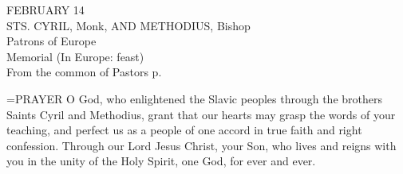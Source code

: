 \begin{center}\normalsize FEBRUARY 14\\
\footnotesize STS. CYRIL, Monk, AND METHODIUS, Bishop\\
\footnotesize Patrons of Europe\\
\footnotesize Memorial (In Europe: feast)\\
\footnotesize From the common of Pastors p. \\
\end{center}

\hangindent=\parindent \small{PRAYER 
O God, who enlightened the Slavic peoples
through the brothers Saints Cyril and Methodius,
grant that our hearts may grasp the words of your teaching,
and perfect us as a people of one accord
in true faith and right confession.
Through our Lord Jesus Christ, your Son,
who lives and reigns with you in the unity of the Holy Spirit,
one God, for ever and ever.\\}
 
